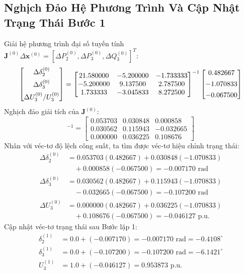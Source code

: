 \documentclass[12pt,a4paper,oneside]{report}
\begin{document}
\subsection{Nghịch Đảo Hệ Phương Trình Và Cập Nhật Trạng Thái Bước 1}
Giải hệ phương trình đại số tuyến tính $\mathbf{J}^{(0)} \Delta \mathbf{x}^{(0)} = [\Delta P_2^{(0)}, \Delta P_3^{(0)}, \Delta Q_3^{(0)}]^T$:
\begin{equation}
\resizebox{0.92\textwidth}{!}{$
\begin{bmatrix}
\Delta \delta_2^{(0)} \\[4pt]
\Delta \delta_3^{(0)} \\[4pt]
\Delta U_3^{(0)} / U_3^{(0)}
\end{bmatrix}
=
\begin{bmatrix}
21.580000 & -5.200000 & -1.733333 \\
-5.200000 & 9.137500 & 2.787500 \\
1.733333 & -3.045833 & 8.272500
\end{bmatrix}^{-1}
\begin{bmatrix}
0.482667 \\[4pt]
-1.070833 \\[4pt]
-0.067500
\end{bmatrix}
$}
\end{equation}
Nghịch đảo giải tích của $\mathbf{J}^{(0)}$:
\begin{equation}
[\mathbf{J}^{(0)}]^{-1} =
\begin{bmatrix}
0.053703 & 0.030848 & 0.000858 \\
0.030562 & 0.115943 & -0.032665 \\
0.000000 & 0.036225 & 0.108676
\end{bmatrix}
\end{equation}
Nhân với véc-tơ độ lệch công suất, ta tìm được véc-tơ hiệu chỉnh trạng thái:
\begin{align}
\Delta \delta_2^{(0)} &= 0.053703(0.482667) + 0.030848(-1.070833) \nonumber \\
&\quad + 0.000858(-0.067500) = -0.007170\text{ rad} \\
\Delta \delta_3^{(0)} &= 0.030562(0.482667) + 0.115943(-1.070833) \nonumber \\
&\quad - 0.032665(-0.067500) = -0.107200\text{ rad} \\
\Delta U_3^{(0)} &= 0.000000(0.482667) + 0.036225(-1.070833) \nonumber \\
&\quad + 0.108676(-0.067500) = -0.046127\text{ p.u.}
\end{align}
Cập nhật véc-tơ trạng thái sau Bước lặp 1:
\begin{align}
\delta_2^{(1)} &= 0.0 + (-0.007170) = -0.007170\text{ rad} = -0.4108^\circ \\
\delta_3^{(1)} &= 0.0 + (-0.107200) = -0.107200\text{ rad} = -6.1421^\circ \\
U_3^{(1)} &= 1.0 + (-0.046127) = 0.953873\text{ p.u.}
\end{align}
\end{document}
